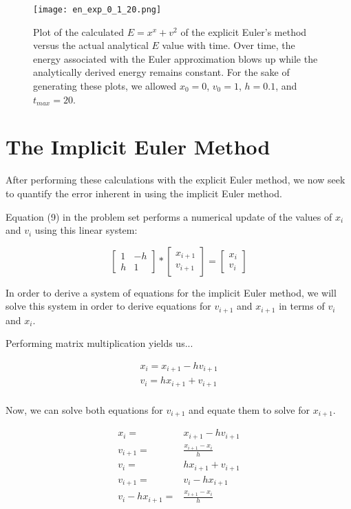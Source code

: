 \documentclass{article}
\begin{document}
\begin{figure}
    \centering
    \texttt{[image: en\_exp\_0\_1\_20.png]}{}
    \caption{Plot of the calculated $E = x^x + v^2$ of the explicit Euler's method versus the actual analytical $E$ value with time.  Over time, the energy associated with the Euler approximation blows up while the analytically derived energy remains constant.  For the sake of generating these plots, we allowed $x_0 = 0$, $v_0 = 1$, $h = 0.1$, and $t_{max} = 20$.}
    \label{fig:exp_energy}
\end{figure}

\section{The Implicit Euler Method}

After performing these calculations with the explicit Euler method, we now seek to quantify the error inherent in using the implicit Euler method.

Equation (9) in the problem set performs a numerical update of the values of $x_i$ and $v_i$ using this linear system:

\[
  \begin{bmatrix}
    1 & -h \\
    h & 1 
  \end{bmatrix}
  *
  \begin{bmatrix}
  x_{i + 1} \\
  v_{i + 1}
  \end{bmatrix}
  =
  \begin{bmatrix}
  x_i \\
  v_i
  \end{bmatrix}
\]

In order to derive a system of equations for the implicit Euler method, we will solve this system in order to derive equations for $v_{i + 1}$ and $x_{i + 1}$ in terms of $v_i$ and $x_i$.

Performing matrix multiplication yields us...

\begin{eqnarray}
    x_i = x_{i + 1} - hv_{i + 1} \\
    v_i = hx_{i + 1} + v_{i + 1} \\
\end{eqnarray}

Now, we can solve both equations for $v_{i + 1}$ and equate them to solve for $x_{i + 1}$.

\begin{eqnarray}
    x_i =& x_{i + 1} - hv_{i + 1} \\
    v_{i + 1} =& \frac{x_{i + 1} - x_i}{h} \\
    v_i =& hx_{i + 1} + v_{i + 1} \\
    v_{i + 1} =& v_i - hx_{i + 1} \\
    v_i - hx_{i + 1} =& \frac{x_{i + 1} - x_i}{h}
\end{eqnarray}
\end{document}
